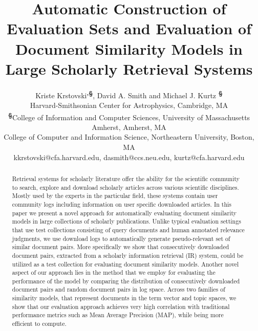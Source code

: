 \documentclass[letterpaper]{article}
\begin{document}
\title{Automatic Construction of Evaluation Sets and Evaluation of Document Similarity Models in Large Scholarly Retrieval Systems}
\author{
Kriste Krstovski\textsuperscript{\small\textbf{\dag,\S}}, David A. Smith\textsuperscript{\small\textbf{\ddag}} and Michael J. Kurtz \textsuperscript{\small\textbf{\S}} \\
\textsuperscript{\small\textbf{\dag}}Harvard-Smithsonian Center for Astrophysics, Cambridge, MA \\
\textsuperscript{\small\textbf{\S}}College of Information and Computer Sciences, University of Massachusetts Amherst, Amherst, MA\\
\textsuperscript{\small\textbf{\ddag}}College of Computer and Information Science, Northeastern University, Boston, MA\\
kkrstovski@cfa.harvard.edu, dasmith@ccs.neu.edu, kurtz@cfa.harvard.edu\\
}
\maketitle

\begin{abstract}
Retrieval systems for scholarly literature offer the ability for the scientific community to search, explore and download scholarly articles across various scientific disciplines. Mostly used by the experts in the particular field, these systems contain user community logs including information on user specific downloaded articles. 
In this paper we present a novel approach for automatically evaluating document similarity models in large collections of scholarly publications. Unlike typical evaluation settings that use test collections consisting of query documents and human annotated relevance judgments, we use download logs to automatically generate pseudo-relevant set of similar document pairs. More specifically we show that consecutively downloaded document pairs, extracted from a scholarly information retrieval (IR) system, could be utilized as a test collection for evaluating document similarity models. Another novel aspect of our approach lies in the method that we employ for evaluating the performance of the model by comparing the distribution of consecutively downloaded document pairs and random document pairs in log space. Across two families of similarity models, that represent documents in the term vector and topic spaces, we show that our evaluation approach achieves very high correlation with traditional performance metrics such as Mean Average Precision (MAP), while being more efficient to compute. 
\end{abstract}
\end{document}
